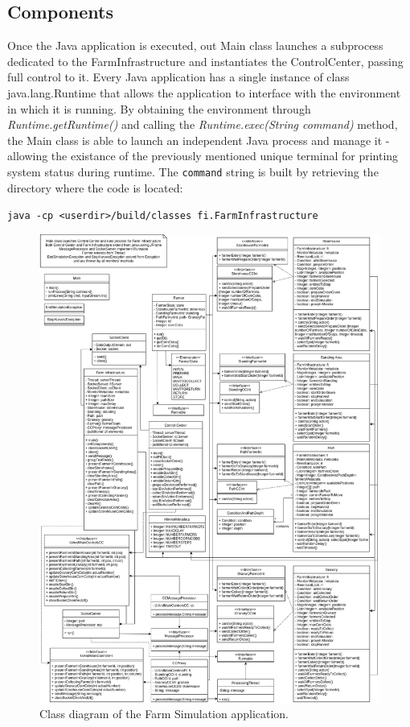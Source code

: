 \documentclass[12pt]{article}
\begin{document}
\subsection{Components} %

Once the Java application is executed, out Main class launches a subprocess dedicated to the FarmInfrastructure and instantiates the ControlCenter, passing full 
control to it.
Every Java application has a single instance of class java.lang.Runtime that allows the application to interface with the environment in which it is running.
By obtaining the environment through \textit{Runtime.getRuntime()} and calling the \textit{Runtime.exec(String command)} method, the Main class is able to launch 
an independent Java process and manage it - allowing the existance of the previously mentioned unique terminal for printing system status during runtime.
The \texttt{command} string is built by retrieving the directory where the code is located:  

\texttt{java -cp <userdir>/build/classes fi.FarmInfrastructure}

\begin{figure}[H]
  \centering
  \begin{minipage}{1.05\textwidth}
    \centering
    \includegraphics[width=\linewidth]{img/ClassDiagram.png}
  \end{minipage}%
  \caption{Class diagram of the Farm Simulation application.}
  \label{ClassDiagram}
\end{figure} 
\end{document}
